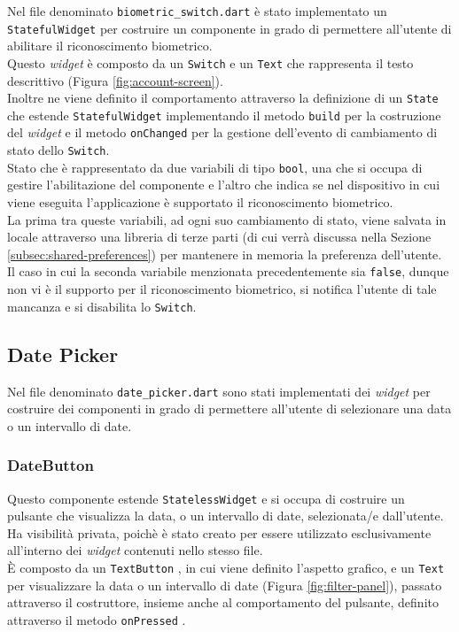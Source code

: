 Nel file denominato \lstinline{biometric_switch.dart} è stato implementato un \lstinline{StatefulWidget} per costruire un componente in grado di permettere all'utente di abilitare il riconoscimento biometrico. \\
Questo \emph{widget} è composto da un \lstinline{Switch} \cite{site:switch} e un \lstinline{Text} \cite{site:text} che rappresenta il testo descrittivo (Figura \ref{fig:account-screen}).\\
Inoltre ne viene definito il comportamento attraverso la definizione di un \lstinline{State} che estende \lstinline{StatefulWidget} implementando il metodo \lstinline{build} per la costruzione del \emph{widget} e il metodo \lstinline{onChanged} per la gestione dell'evento di cambiamento di stato dello \lstinline{Switch}.\\
Stato che è rappresentato da due variabili di tipo \lstinline{bool}, una che si occupa di gestire l'abilitazione del componente e l'altro che indica se nel dispositivo in cui viene eseguita l'applicazione è supportato il riconoscimento biometrico.\\
La prima tra queste variabili, ad ogni suo cambiamento di stato, viene salvata in locale attraverso una libreria di terze parti (di cui verrà discussa nella Sezione \ref{subsec:shared-preferences}) per mantenere in memoria la preferenza dell'utente. \\
Il caso in cui la seconda variabile menzionata precedentemente sia \lstinline{false}, dunque non vi è il supporto per il riconoscimento biometrico, si notifica l'utente di tale mancanza e si disabilita lo \lstinline{Switch}.

\subsection{Date Picker}
\label{subsec:date-picker}

Nel file denominato \lstinline{date_picker.dart} sono stati implementati dei \emph{widget} per costruire dei componenti in grado di permettere all'utente di selezionare una data o un intervallo di date.

\subsubsection*{DateButton}
\label{subsubsec:date-button}

Questo componente estende \lstinline{StatelessWidget} e si occupa di costruire un pulsante che visualizza la data, o un intervallo di date, selezionata/e dall'utente.\\
Ha visibilità privata, poichè è stato creato per essere utilizzato esclusivamente all'interno dei \emph{widget} contenuti nello stesso file.\\
È composto da un \lstinline{TextButton} \cite{site:text-button}, in cui viene definito l'aspetto grafico, e un \lstinline{Text} per visualizzare la data o un intervallo di date (Figura \ref{fig:filter-panel}), passato attraverso il costruttore, insieme anche al comportamento del pulsante, definito attraverso il metodo \lstinline{onPressed} \cite{site:on-pressed}.

